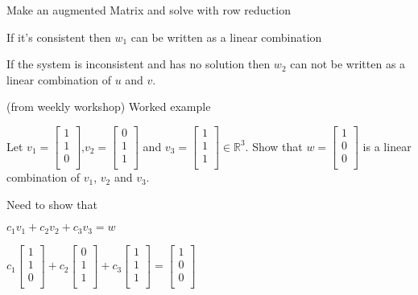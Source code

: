 \documentclass{extarticle}
\begin{document}
\begin{multicols}{2}
\begin{tcolorbox}[enhanced jigsaw,sharp corners,coltext=black,colback=BurntOrange!25!white,boxrule=0pt,breakable,size=minimal]
Make an augmented Matrix and solve with row reduction

If it's consistent then $w_1$ can be written as a linear combination

If the system is inconsistent and has no solution then $w_2$ can not be written as a linear combination of $u$ and $v$.

\end{tcolorbox}

(from weekly workshop)
Worked example

Let 
$v_1=\left[\begin{matrix}1\\1\\0\\\end{matrix}\right]$,$v_2=\left[\begin{matrix}0\\1\\1\\\end{matrix}\right]$ and $v_3=\left[\begin{matrix}1\\1\\1\\\end{matrix}\right]$$\in{\mathbb{R}}^3$.
Show that
$w=\left[\begin{matrix}1\\0\\0\\\end{matrix}\right]$
is a linear combination of $v_1$, $v_2$ and $v_3$.

Need to show that

$c_1v_1+c_2v_2+ c_3v_3=w$

$c_1\left[\begin{matrix}1\\1\\0\\\end{matrix}\right]+c_2\left[\begin{matrix}0\\1\\1\\\end{matrix}\right]+ c_3\left[\begin{matrix}1\\1\\1\\\end{matrix}\right]=\left[\begin{matrix}1\\0\\0\\\end{matrix}\right]$


\end{multicols}
\end{document}
